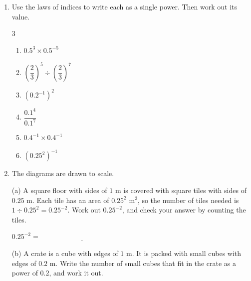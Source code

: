 \documentclass[12pt,a4paper]{article}
\newcommand{\ansline}[1][2.2cm]{\underline{\hspace{#1}}}
\begin{document}
\begin{enumerate}[resume]

\item Use the laws of indices to write each as a single power. Then work out
its value.
\begin{multicols}{3}
\begin{enumerate}[itemsep=3.2em]
  \item $0.5^3\times0.5^{-5}$
  \item $\left(\dfrac23\right)^5\div\left(\dfrac23\right)^7$
  \item $(0.2^{-1})^2$
  \item $\dfrac{0.1^4}{0.1^7}$
  \item $0.4^{-1}\times0.4^{-1}$
  \item $(0.25^2)^{-1}$
\end{enumerate}
\end{multicols}
\vspace{2.5em}

\item The diagrams are drawn to scale.
\vspace{2pt}

\begin{minipage}[t]{0.47\linewidth}
(a) A square floor with sides of $1$ m is covered with square tiles with
sides of $0.25$ m. Each tile has an area of $0.25^2$ m$^2$, so the number of
tiles needed is $1\div0.25^2=0.25^{-2}$. Work out $0.25^{-2}$, and check your
answer by counting the tiles.

\vspace{6pt}
\centering
{}

\vspace{8pt}
\raggedright
$0.25^{-2}=\ansline[5cm]$
\end{minipage}\hfill
\begin{minipage}[t]{0.47\linewidth}
(b) A crate is a cube with edges of $1$ m. It is packed with small cubes with
edges of $0.2$ m. Write the number of small cubes that fit in the crate as a
power of $0.2$, and work it out.


\end{minipage}
\end{enumerate}
\end{document}
